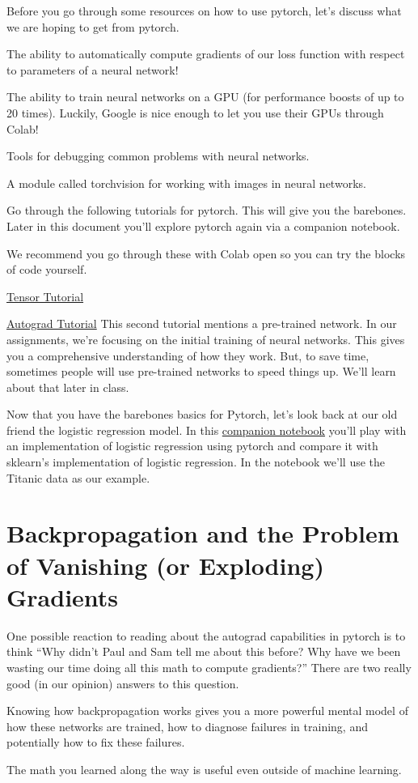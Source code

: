 \documentclass[assignment07_Solutions]{subfiles}
\begin{document}
Before you go through some resources on how to use pytorch, let's discuss what we are hoping to get from pytorch.
\bi
\item The ability to automatically compute gradients of our loss function with respect to parameters of a neural network!
\item The ability to train neural networks on a GPU (for performance boosts of up to 20 times).  Luckily, Google is nice enough to let you use their GPUs through Colab!
\item Tools for debugging common problems with neural networks.
\item A module called torchvision for working with images in neural networks.
\ei

Go through the following tutorials for pytorch.  This will give you the barebones.  Later in this document you'll explore pytorch again via a companion notebook.
\begin{externalresources}[(15 minutes)]
We recommend you go through these with Colab open so you can try the blocks of code yourself.
\bi
\item \href{https://pytorch.org/tutorials/beginner/blitz/tensor_tutorial.html}{Tensor Tutorial} 
\item \href{https://pytorch.org/tutorials/beginner/blitz/autograd_tutorial.html}{Autograd Tutorial} 
This second tutorial mentions a pre-trained network. In our assignments, we're focusing on the initial training of neural networks. This gives you a comprehensive understanding of how they work. But, to save time, sometimes people will use pre-trained networks to speed things up. We'll learn about that later in class.
\ei
\end{externalresources}

\begin{externalresources}[(60 minutes)]
Now that you have the barebones basics for Pytorch, let's look back at our old friend the logistic regression model.  In this \href{https://colab.research.google.com/drive/1qr6qFyGrADW8_vQsb1k5QGKUQuhyzFV8?usp=sharing}{companion notebook} you'll play with an implementation of logistic regression using pytorch and compare it with sklearn's implementation of logistic regression.  In the notebook we'll use the Titanic data as our example.
\end{externalresources}


\section{Backpropagation and the Problem of Vanishing (or Exploding) Gradients}
One possible reaction to reading about the autograd capabilities in pytorch is to think ``Why didn't Paul and Sam tell me about this before?  Why have we been wasting our time doing all this math to compute gradients?''  There are two really good (in our opinion) answers to this question.
\be
\item Knowing how backpropagation works gives you a more powerful mental model of how these networks are trained, how to diagnose failures in training, and potentially how to fix these failures.
\item The math you learned along the way is useful even outside of machine learning.
\ee
\end{document}
